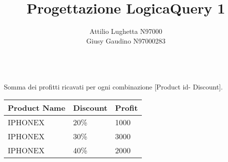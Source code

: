 \documentclass[11pt,a4paper]{article}
\title{Progettazione Logica}
\author{Attilio Lughetta N97000\\Giusy Gaudino N97000283}
\date{}
\begin{document}
\maketitle

 \title{\textbf{Query 1}}\\
Somma dei profitti ricavati per ogni combinazione [Product id- Discount].
 \begin{center}
 	\begin{table}[h!]
 	\begin{tabular}{|l|l|l|}
 		\hline
 		Product Name  & Discount & Profit \\ \hline
 		IPHONEX  & 20\% & 1000\EUR \\ \hline
 		IPHONEX  & 30\% & 3000\EUR \\ \hline
 		IPHONEX & 40\% & 2000\EUR \\ \hline
 	\end{tabular}
 \end{table}
 \end{center}
\end{document}
